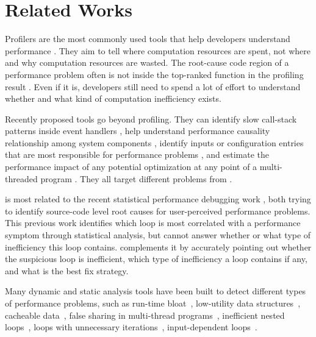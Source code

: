\section{Related Works}
\label{sec:related}

Profilers are the most commonly used tools that help developers understand
performance
\cite{Zaparanuks:2012:AP:2254064.2254074,Coppa:2012:IP:2254064.2254076,
D'Elia:2011:MHC:1993498.1993559, 
Mytkowicz:2010:EAJ:1806596.1806618,
Ravindranath:2012:AMA:2387880.2387891,
Jovic:2011:CMY:2048066.2048081,IntroPerf}.
They aim to tell where 
computation resources are spent, 
not where and why computation resources are wasted. 
The root-cause code region of a performance problem often is not inside
the top-ranked function in the profiling result \cite{SongOOPSLA2014}.
Even if it is, developers still need to spend a lot of effort to understand
whether and what kind of computation inefficiency exists.

Recently proposed tools go beyond profiling.
They can identify slow call-stack patterns inside event handlers
\cite{Han:2012:PDL:2337223.2337241}, help understand performance causality
relationship among system components
\cite{TaoAsplos2014}, identify inputs 
or configuration entries that are most responsible for performance problems
\cite{Attariyan:2012:XAR:2387880.2387910},
and estimate the performance impact of any
potential optimization at any point of a multi-threaded program
\cite{coz.sosp15}. 
They all target different problems from \Tool. 

\Tool is most related to
the recent statistical performance debugging work
\citep{SongOOPSLA2014}, both trying to identify source-code level root causes
for user-perceived performance problems. 
This previous work identifies which loop is most correlated with 
a performance symptom through statistical analysis, 
but cannot answer whether or 
what type of inefficiency this loop contains.
\Tool complements it by
accurately pointing out whether the suspicious loop is inefficient,
which type of inefficiency a loop contains if any, and 
what is the best fix strategy.

Many dynamic and static analysis tools have been built to detect different
types of performance problems, such as 
run-time bloat~\cite{Dufour:2008:STC:1453101.1453111, Xu:2009:GFP:1542476.1542523, Xu:2010:DIC:1806596.1806616}, 
low-utility data structures~\cite{Xu:2010:FLD:1806596.1806617}, 
cacheable data~\cite{Cachetor}, false sharing in
multi-thread programs~\cite{Liu:2011:SPD:2048066.2048070},
inefficient nested loops~\cite{Alabama},
loops with unnecessary iterations~\cite{CARAMEL,IsilDillig.PLDI15},
input-dependent loops~\cite{xiao13:context}. 

